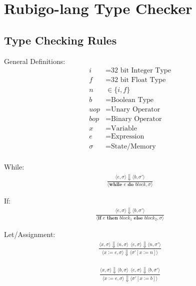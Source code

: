 \documentclass[12pt]{article}
\begin{document}
    \section{Rubigo-lang Type Checker}	
    	\subsection{Type Checking Rules}
	General Definitions:
    	\begin{align*}
		i &= \text{32 bit Integer Type} \\
		f &= \text{32 bit Float Type} \\
		n &\in \{i, f\} \\
		b &= \text{Boolean Type} \\
		uop &= \text{Unary Operator} \\
		bop &= \text{Binary Operator} \\
		x &= \text{Variable} \\
		e &= \text{Expression} \\
		\sigma &= \text{State/Memory} \\
	\end{align*}

	While:
	\begin{align*}
		\frac{\langle e, \sigma \rangle\Downarrow \langle b, \sigma' \rangle}
		{\langle \textbf{while } e \textbf{ do } block, \sigma \rangle}
	\end{align*}

	If:
	\begin{align*}
		\frac{\langle e, \sigma \rangle\Downarrow \langle b, \sigma' \rangle}
		{\langle \textbf{if } e \textbf{ then } block_1 \textbf{ else } block_2, \sigma \rangle}
	\end{align*}

	Let/Assignment:
	\begin{align*}
		\frac{
			\langle x, \sigma \rangle\Downarrow \langle n, \sigma \rangle \ \ 
			\langle e, \sigma \rangle\Downarrow \langle n, \sigma' \rangle
		}
		{\langle x := e, \sigma \rangle\Downarrow \langle \sigma' [x := n] \rangle}
	\end{align*}

	\begin{align*}
		\frac{
			\langle x, \sigma \rangle\Downarrow \langle b, \sigma \rangle \ \ 
			\langle e, \sigma \rangle\Downarrow \langle b, \sigma' \rangle
		}
		{\langle x := e, \sigma \rangle\Downarrow \langle \sigma' [x := b] \rangle}
	\end{align*}
\end{document}
